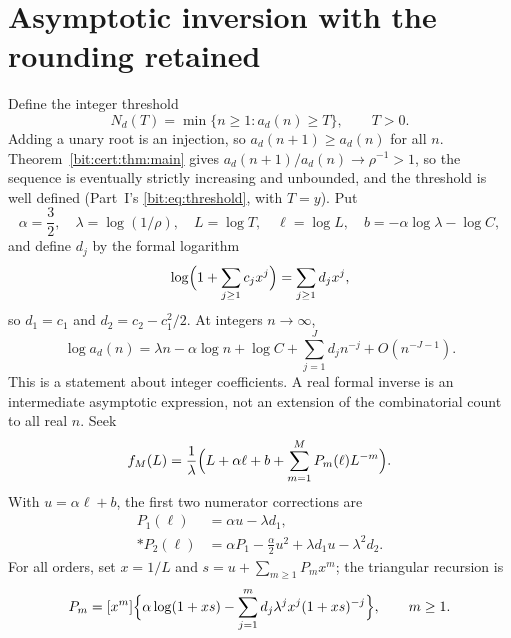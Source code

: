 \documentclass[11pt]{article}
\theoremstyle{definition}\newtheorem{definition}[theorem]{Definition}
\theoremstyle{remark}\newtheorem{remark}[theorem]{Remark}
\begin{document}
\section{Asymptotic inversion with the rounding retained}\label{bit:cert:sec:inverse}
Define the integer threshold
\begin{equation}\label{bit:cert:eq:threshold}
 N_d(T)=\min\{n\ge1:a_d(n)\ge T\},\qquad T>0.
\end{equation}
Adding a unary root is an injection, so $a_d(n+1)\ge a_d(n)$ for all $n$.
Theorem~\ref{bit:cert:thm:main} gives $a_d(n+1)/a_d(n)\to\rho^{-1}>1$, so the
sequence is eventually strictly increasing and unbounded, and the threshold is
well defined (Part~I's \eqref{bit:eq:threshold}, with $T=y$). Put
\begin{equation}\label{bit:cert:eq:inverseparams}
 \alpha=\frac32,\quad \lambda=\log(1/\rho),\quad
 L=\log T,\quad \ell=\log L,\quad
 b=-\alpha\log\lambda-\log C,
\end{equation}
and define $d_j$ by the formal logarithm
\begin{equation}\label{bit:cert:eq:dj}
 \log\Bigl(1+\sum_{j\ge1}c_jx^j\Bigr)=\sum_{j\ge1}d_jx^j,
\end{equation}
so $d_1=c_1$ and $d_2=c_2-c_1^2/2$. At integers $n\to\infty$,
\begin{equation}\label{bit:cert:eq:logasymptotic}
 \log a_d(n)=\lambda n-\alpha\log n+\log C
              +\sum_{j=1}^{J}d_jn^{-j}+O(n^{-J-1}).
\end{equation}
This is a statement about integer coefficients. A real formal inverse is an
intermediate asymptotic expression, not an extension of the combinatorial count
to all real $n$. Seek
\begin{equation}\label{bit:cert:eq:formalinverse}
 f_M(L)=\frac1\lambda\Bigl(L+\alpha\ell+b+
              \sum_{m=1}^{M}P_m(\ell)L^{-m}\Bigr).
\end{equation}
With $u=\alpha\ell+b$, the first two numerator corrections are
\begin{align}
 P_1(\ell)&=\alpha u-\lambda d_1,\label{bit:cert:eq:P1}\\*
 P_2(\ell)&=\alpha P_1-\frac\alpha2u^2
                   +\lambda d_1u-\lambda^2d_2.\label{bit:cert:eq:P2}
\end{align}
For all orders, set $x=1/L$ and $s=u+\sum_{m\ge1}P_mx^m$; the triangular
recursion is
\begin{equation}\label{bit:cert:eq:Prec}
 P_m=[x^m]\Bigl\{\alpha\log(1+xs)
        -\sum_{j=1}^m d_j\lambda^jx^j(1+xs)^{-j}\Bigr\},\qquad m\ge1.
\end{equation}
\end{document}
